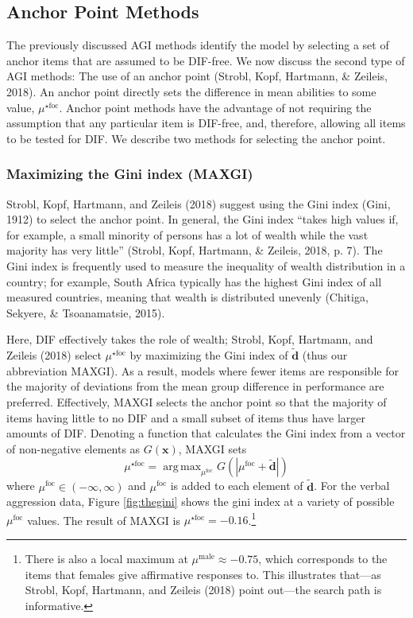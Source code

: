 \documentclass[
  english,
  man,floatsintext]{apa6}
\begin{document}
\hypertarget{anchor-point-methods}{%
\subsection{Anchor Point Methods}\label{anchor-point-methods}}

The previously discussed AGI methods identify the model by selecting a set of anchor items that are assumed to be DIF-free. We now discuss the second type of AGI methods: The use of an anchor point (Strobl, Kopf, Hartmann, \& Zeileis, 2018). An anchor point directly sets the difference in mean abilities to some value, \(\mu^{\star\text{foc}}\). Anchor point methods have the advantage of not requiring the assumption that any particular item is DIF-free, and, therefore, allowing all items to be tested for DIF. We describe two methods for selecting the anchor point.

\hypertarget{maximizing-the-gini-index-maxgi}{%
\subsubsection{Maximizing the Gini index (MAXGI)}\label{maximizing-the-gini-index-maxgi}}

Strobl, Kopf, Hartmann, and Zeileis (2018) suggest using the Gini index (Gini, 1912) to select the anchor point. In general, the Gini index ``takes high values if, for example, a small minority of persons has a lot of wealth while the vast majority has very little'' (Strobl, Kopf, Hartmann, \& Zeileis, 2018, p. 7). The Gini index is frequently used to measure the inequality of wealth distribution in a country; for example, South Africa typically has the highest Gini index of all measured countries, meaning that wealth is distributed unevenly (Chitiga, Sekyere, \& Tsoanamatsie, 2015).

Here, DIF effectively takes the role of wealth; Strobl, Kopf, Hartmann, and Zeileis (2018) select \(\mu^{\star\text{foc}}\) by maximizing the Gini index of \(\tilde{\mathbf{d}}\) (thus our abbreviation MAXGI). As a result, models where fewer items are responsible for the majority of deviations from the mean group difference in performance are preferred. Effectively, MAXGI selects the anchor point so that the majority of items having little to no DIF and a small subset of items thus have larger amounts of DIF. Denoting a function that calculates the Gini index from a vector of non-negative elements as \(G(\mathbf{x})\), MAXGI sets
\begin{equation}
\mu^{\star\text{foc}} = \mathop{\mathrm{arg\,max}}_{\mu^\text{foc}} G(|\mu^\text{foc} + \tilde{\mathbf{d}}|)
\end{equation}
where \(\mu^\text{foc} \in (-\infty, \infty)\) and \(\mu^\text{foc}\) is added to each element of \(\tilde{\mathbf{d}}\). For the verbal aggression data, Figure \ref{fig:thegini} shows the gini index at a variety of possible \(\mu^\text{foc}\) values. The result of MAXGI is \(\mu^{\star\text{foc}} = -0.16\).\footnote{There is also a local maximum at \(\mu^{\text{male}} \approx -0.75\), which corresponds to the items that females give affirmative responses to. This illustrates that---as Strobl, Kopf, Hartmann, and Zeileis (2018) point out---the search path is informative.}
\end{document}
